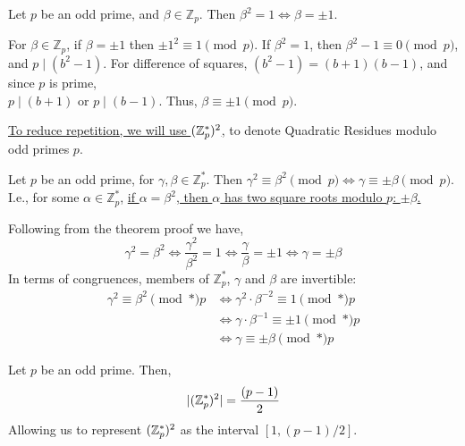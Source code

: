 \begin{theo}

    \label{theo:square_roots_1}

    Let $p$ be an odd prime, and $\beta\in\mathbb{Z}_p$. Then $\beta^2=1\Longleftrightarrow \beta=\pm1$.
\end{theo}
\begin{Proof}
    For $\beta\in\mathbb{Z}_p$, if $\beta=\pm1$ then $\pm1^2\equiv 1\pmod{p}$. If $\beta^2=1$, then $\beta^2-1\equiv 0\pmod{p}$,
    and $p\mid(b^2-1)$. For difference of squares, $(b^2-1)=(b+1)(b-1)$, and since $p$ is prime,\\
    $p\mid(b+1)$ or $p\mid(b-1)$. Thus, $\beta\equiv \pm1\pmod{p}$.
\end{Proof}

\newpage

\noindent
\underline{To reduce repetition, we will use $(\mathbb{Z}_p^*)^2$,} to denote Quadratic Residues modulo odd primes $p$.
\begin{theo}

    \label{theo:square_roots_2}
    
        Let $p$ be an odd prime, for $\gamma,\beta\in\mathbb{Z}_p^*$. Then $\gamma^2\equiv\beta^2\pmod{p}\Longleftrightarrow\gamma\equiv\pm\beta\pmod{p}$.\\
        I.e., for some $\alpha\in\mathbb{Z}_p^*$, \underline{if $\alpha=\beta^2$, then $\alpha$ has two square roots modulo $p$: $\pm\beta$.}
\end{theo}
\begin{Proof}
Following from the theorem proof we have,
\[\gamma^2 = \beta^2 \iff \frac{\gamma^2}{\beta^2} = 1 \iff \frac{\gamma}{\beta} = \pm 1 \iff \gamma = \pm \beta\]  
In terms of congruences, members of $\mathbb{Z}_p^*$, $\gamma$ and $\beta$ are invertible:
\begin{align*} 
\gamma^2 \equiv \beta^2 \pmod*{p} &\iff \gamma^2\cdot\beta^{-2} \equiv 1 \pmod*{p}\\
&\iff \gamma\cdot\beta^{-1} \equiv \pm 1 \pmod*{p}\\
&\iff \gamma \equiv \pm \beta \pmod*{p}
\end{align*}

\noindent

\end{Proof}

\begin{theo}
    
    Let $p$ be an odd prime. Then,
     \Large\[|(\mathbb{Z}_p^*)^2|=\frac{(p-1)}{2}
     \]
     \normalsize
     \noindent
     Allowing us to represent $(\mathbb{Z}_p^*)^2$ as the interval $[1,(p-1)/2]$.
\end{theo}

